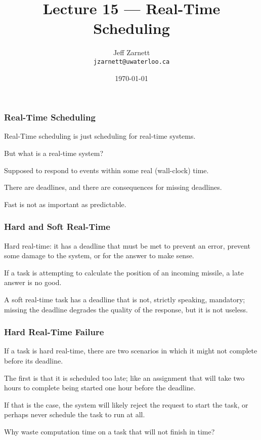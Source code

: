 

\title{Lecture 15 --- Real-Time Scheduling}

\author{Jeff Zarnett \\ \small \texttt{jzarnett@uwaterloo.ca}}
\date{\today}




\begin{frame}
  \titlepage

 \end{frame}

\begin{frame}
\frametitle{Real-Time Scheduling}

Real-Time scheduling is just scheduling for real-time systems.

But what is a real-time system?

Supposed to respond to events within some real (wall-clock) time. 

There are deadlines, and there are consequences for missing deadlines. 

Fast is not as important as predictable.

\end{frame}

\begin{frame}
\frametitle{Hard and Soft Real-Time}

\alert{Hard real-time}: it has a deadline that must be met to prevent an error, prevent some damage to the system, or for the answer to make sense. 

If a task is attempting to calculate the position of an incoming missile, a late answer is no good. 

A \alert{soft real-time} task has a deadline that is not, strictly speaking, mandatory; missing the deadline degrades the quality of the response, but it is not useless.


\end{frame}

\begin{frame}
\frametitle{Hard Real-Time Failure}

If a task is hard real-time, there are two scenarios in which it might not complete before its deadline. 

The first is that it is scheduled too late; like an assignment that will take two hours to complete being started one hour before the deadline. 

If that is the case, the system will likely reject the request to start the task, or perhaps never schedule the task to run at all. 

Why waste computation time on a task that will not finish in time? 

\end{frame}

